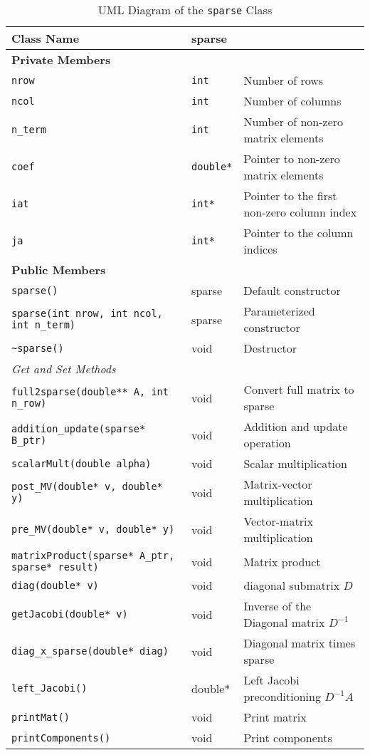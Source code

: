 \begin{table}[h]
\centering
\renewcommand{\arraystretch}{1.5}
\begin{tabular}{|p{8cm}|p{3cm}|p{7cm}|}
\hline
\rowcolor{gray!20}
\textbf{Class Name} & \multicolumn{2}{p{11cm}|}{sparse} \\
\hline
\multicolumn{3}{|p{16cm}|}{\textbf{Private Members}} \\
\hline
\lstinline|nrow| & \lstinline|int| & Number of rows \\
\hline
\lstinline|ncol| & \lstinline|int| & Number of columns \\
\hline
\lstinline|n_term| & \lstinline|int| & Number of non-zero matrix elements \\
\hline
\lstinline|coef| & \lstinline|double*| & Pointer to non-zero matrix elements \\
\hline
\lstinline|iat| & \lstinline|int*| & Pointer to the first non-zero column index \\
\hline
\lstinline|ja| & \lstinline|int*| & Pointer to the column indices \\
\hline
\multicolumn{3}{|p{16cm}|}{\textbf{Public Members}} \\
\hline
\lstinline|sparse()| & sparse & Default constructor \\
\hline
\lstinline|sparse(int nrow, int ncol, int n_term)| & sparse & Parameterized constructor \\
\hline
\lstinline|~sparse()| & void & Destructor \\
\hline
\multicolumn{3}{|p{16cm}|}{\textit{Get and Set Methods}} \\
\hline
\lstinline|full2sparse(double** A, int n_row)| & void & Convert full matrix to sparse \\
\hline
\lstinline|addition_update(sparse* B_ptr)| & void & Addition and update operation \\
\hline
\lstinline|scalarMult(double alpha)| & void & Scalar multiplication \\
\hline
\lstinline|post_MV(double* v, double* y)| & void & Matrix-vector multiplication \\
\hline
\lstinline|pre_MV(double* v, double* y)| & void & Vector-matrix multiplication \\
\hline
\lstinline|matrixProduct(sparse* A_ptr, sparse* result)| & void & Matrix product \\
\hline
\lstinline|diag(double* v)| & void & diagonal submatrix $D$ \\
\hline
\lstinline|getJacobi(double* v)| & void & Inverse of the Diagonal matrix $D^{-1}$\\
\hline
\lstinline|diag_x_sparse(double* diag)| & void & Diagonal matrix times sparse \\
\hline
\lstinline|left_Jacobi()| & double* & Left Jacobi preconditioning $D^{-1}A$ \\
\hline
\lstinline|printMat()| & void & Print matrix \\
\hline
\lstinline|printComponents()| & void & Print components \\
\hline
\end{tabular}
\caption{UML Diagram of the \texttt{sparse} Class}
\label{tab:UML}

\end{table}
